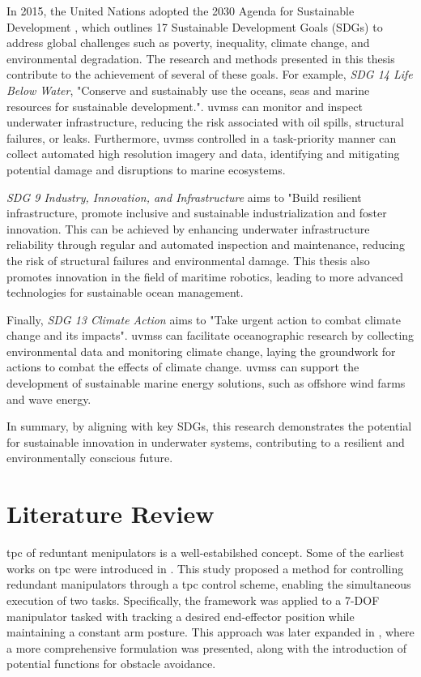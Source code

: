 In 2015, the United Nations adopted the 2030 Agenda for Sustainable Development
\cite{UN2030Agenda}, which outlines 17 Sustainable Development Goals (SDGs) to
address global challenges such as poverty, inequality, climate change, and
environmental degradation. The research and methods presented in this thesis
contribute to the achievement of several of these goals. For example, \emph{SDG 14
Life Below Water}, "Conserve and sustainably use the oceans, seas and marine
resources for sustainable development.". \gls{uvms}s can monitor and inspect underwater
infrastructure, reducing the risk associated with oil spills, structural failures,
or leaks. Furthermore, \gls{uvms}s controlled in a task-priority manner can collect automated
high resolution imagery and data, identifying and mitigating potential
damage and disruptions to marine ecosystems.

\emph{SDG 9 Industry, Innovation, and Infrastructure} aims to "Build resilient
infrastructure, promote inclusive and sustainable industrialization and foster
innovation. This can be achieved by enhancing underwater infrastructure reliability
through regular and automated inspection and maintenance, reducing the risk of
structural failures and environmental damage. This thesis also promotes innovation
in the field of maritime robotics, leading to more advanced technologies for
sustainable ocean management.

Finally, \emph{SDG 13 Climate Action} aims to "Take urgent action to combat climate
change and its impacts". \gls{uvms}s can facilitate oceanographic research by collecting
environmental data and monitoring climate change, laying the groundwork for actions
to combat the effects of climate change. \gls{uvms}s can support the development of
sustainable marine energy solutions, such as offshore wind farms and wave energy.

In summary, by aligning with key SDGs, this research demonstrates the potential
for sustainable innovation in underwater systems, contributing to a resilient 
and environmentally conscious future.

\section{Literature Review}
\label{sec:introduction:literature}

\gls{tpc} of reduntant menipulators is a well-estabilshed concept.
Some of the earliest works on \gls{tpc} were introduced in 
\cite{hanafusa1981}. This study proposed a method for controlling redundant 
manipulators through a \gls{tpc} control scheme, enabling the simultaneous 
execution of two tasks. Specifically, the framework was applied to a 7-DOF 
manipulator tasked with tracking a desired end-effector position while 
maintaining a constant arm posture. This approach was later expanded in 
\cite{nakamura1987}, where a more comprehensive formulation was presented, 
along with the introduction of potential functions for obstacle avoidance.

